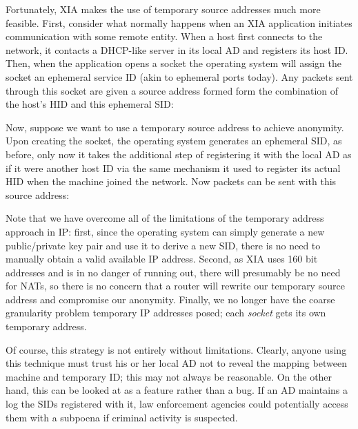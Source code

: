 \documentclass{article}
\newcommand{\entrynode}[1]{
  \SetVertexNormal[Shape      = circle,
                   FillColor  = black,
                   LineWidth  = 0pt,
                   MinSize    = 0pt]
  \Vertex[L={\tiny\,}]{#1}
  \SetVertexNormal[Shape      = circle,
                   FillColor  = white,
                   LineWidth  = 2pt]
}
\begin{document}
Fortunately, XIA makes the use of temporary source addresses much more feasible. First, consider what normally happens when an XIA application initiates communication with some remote entity. When a host first connects to the network, it contacts a DHCP-like server in its local AD and registers its host ID. Then, when the application opens a socket the operating system will assign the socket an ephemeral service ID (akin to ephemeral ports today). Any packets sent through this socket are given a source address formed form the combination of the host's HID and this ephemeral SID:
\begin{center}
\end{center}
Now, suppose we want to use a temporary source address to achieve anonymity. Upon creating the socket, the operating system generates an ephemeral SID, as before, only now it takes the additional step of registering it with the local AD as if it were another host ID via the same mechanism it used to register its actual HID when the machine joined the network. Now packets can be sent with this source address:
\begin{center}
\end{center}
Note that we have overcome all of the limitations of the temporary address approach in IP: first, since the operating system can simply generate a new public/private key pair and use it to derive a new SID, there is no need to manually obtain a valid available IP address. Second, as XIA uses 160 bit addresses and is in no danger of running out, there will presumably be no need for NATs, so there is no concern that a router will rewrite our temporary source address and compromise our anonymity. Finally, we no longer have the coarse granularity problem temporary IP addresses posed; each {\em socket} gets its own temporary address.

Of course, this strategy is not entirely without limitations. Clearly, anyone using this technique must trust his or her local AD not to reveal the mapping between machine and temporary ID; this may not always be reasonable. On the other hand, this can be looked at as a feature rather than a bug. If an AD maintains a log the SIDs registered with it, law enforcement agencies could potentially access them with a subpoena if criminal activity is suspected.
\end{document}
